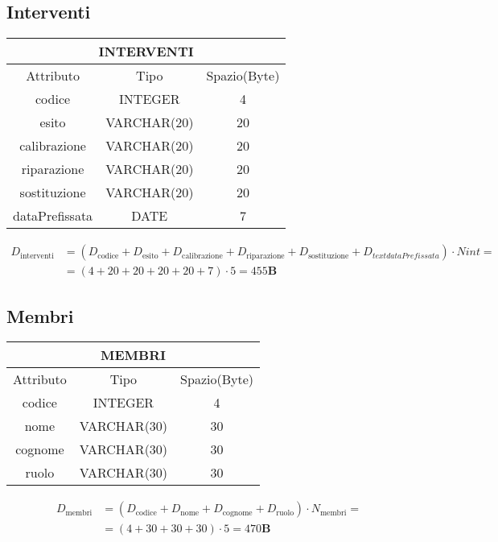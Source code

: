 \subsection{Interventi}
\begin{tabular}{ |c|c|c|}
  \hline
  \multicolumn{3}{|c|}{\textbf{INTERVENTI}} \\
  \hline
  Attributo & Tipo & Spazio(Byte) \\
  \hline
  codice & INTEGER & 4 \\
  esito & VARCHAR(20) & 20 \\
  calibrazione & VARCHAR(20) & 20 \\
  riparazione & VARCHAR(20) & 20 \\
  sostituzione & VARCHAR(20) & 20 \\
  dataPrefissata & DATE & 7 \\
  \hline
\end{tabular}
\begin{equation}
  \begin{aligned}
    D_{\text{interventi}} &=(D_{\text{codice}} + D_{\text{esito}} +D_{\text{calibrazione}} +D_{\text{riparazione}} + D_{\text{sostituzione}} + D_{text{dataPrefissata}}) \cdot  Nint =\\
    &=(4+20+20+20+20+7)\cdot 5 = 455\textbf{B}
  \end{aligned}
\end{equation}
\subsection{Membri}
\begin{tabular}{ |c|c|c|}
  \hline
  \multicolumn{3}{|c|}{\textbf{MEMBRI}}\\
  \hline
  Attributo & Tipo & Spazio(Byte) \\
  \hline
  codice & INTEGER & 4 \\
  nome & VARCHAR(30) & 30 \\
  cognome & VARCHAR(30) & 30 \\
  ruolo & VARCHAR(30) & 30\\
  \hline
\end{tabular}
\begin{equation}
  \begin{aligned}
    D_{\text{membri}} &=(D_{\text{codice}} + D_{\text{nome}} +D_{\text{cognome}} +D_{\text{ruolo}}) \cdot  N_{\text{membri}} =\\
    &=(4+30+30+30) \cdot 5 = 470\textbf{B}
  \end{aligned}
\end{equation}

